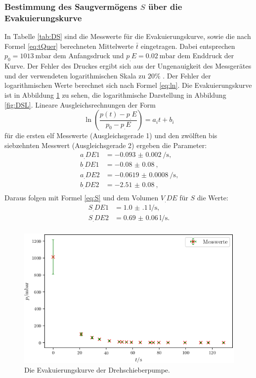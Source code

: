 \subsubsection{Bestimmung des Saugvermögens $S$ über die Evakuierungskurve}

In Tabelle \ref{tab:DS} sind die Messwerte für die Evakuierungskurve, sowie die nach Formel \eqref{eq:tQuer} berechneten Mittelwerte $\bar{t}$ eingetragen.
Dabei entsprechen $p_0=\SI{1013}{\milli\bar}$ dem Anfangsdruck und $p_.E=\SI{0.02}{\milli\bar}$ dem Enddruck der Kurve. Der Fehler des Druckes ergibt sich aus der Ungenauigkeit des Messgerätes und der verwendeten logarithmischen Skala zu $20\%$ \cite{V70}. 
Der Fehler der logarithmischen Werte berechnet sich nach Formel \eqref{eq:ln}.
Die Evakuierungskurve ist in Abbildung \ref{fig:DSE} zu sehen, die logarithmische Darstellung in Abbildung \ref{fig:DSL}.
Lineare Ausgleichsrechnungen der Form
\[
\ln\left(\frac{p(t)-p_.E}{p_0-p_.E}\right) = a_it+b_i
\]
für die ersten elf Messwerte (Ausgleichsgerade 1) und den zwölften bis siebzehnten Messwert (Ausgleichsgerade 2) ergeben die Parameter:
\begin{align*}
a_.{DE1} &= \SI{-0.093(2)}{\per\second} \text{,}\\
b_.{DE1} &= \SI{-0.08(8)}{} \text{,}\\
a_.{DE2} &= \SI{-0.0619(8)}{\per\second} \text{,}\\
b_.{DE2} &= \SI{-2.51(8)}{} \text{,}\\
\end{align*} 
Daraus folgen mit Formel \eqref{eq:S} und dem Volumen $V_.{DE}$ für $S$ die Werte:
\begin{align*}
S_.{DE1} &= \SI{1.0(1)}{\litre\per\second} \text{,}\\
S_.{DE2} &= \SI{0.69(6)}{\litre\per\second} \text{.}\\
\end{align*}

\begin{figure}
\centering
\includegraphics[width=\linewidth-70pt,height=\textheight-70pt,keepaspectratio]{content/images/DSE.png}
\caption{Die Evakuierungskurve der Drehschieberpumpe.}
\label{fig:DSE}
\end{figure}

